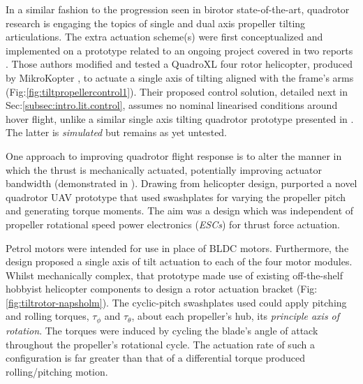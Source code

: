 \par
In a similar fashion to the progression seen in birotor state-of-the-art, quadrotor research is engaging the topics of single and dual axis propeller tilting articulations. The extra actuation scheme(s) were first conceptualized and implemented on a prototype related to an ongoing project covered in two reports \cite{tiltpropellercontrol,tiltpropellerflight}. Those authors modified and tested a QuadroXL four rotor helicopter, produced by MikroKopter \cite{mikrokopter}, to actuate a single axis of tilting aligned with the frame's arms (Fig:\ref{fig:tiltpropellercontrol1}). Their proposed control solution, detailed next in Sec:\ref{subsec:intro.lit.control}, assumes no nominal linearised conditions around hover flight, unlike a similar single axis tilting quadrotor prototype presented in \cite{singleaxistilting}. The latter is \emph{simulated} but remains as yet untested.
\par
One approach to improving quadrotor flight response is to alter the manner in which the thrust is mechanically actuated, potentially improving actuator bandwidth (demonstrated in \cite{tiltgasco,tiltrihani}). Drawing from helicopter design, \cite{napsholm} purported a novel quadrotor UAV prototype that used swashplates for varying the propeller pitch and generating torque moments. The aim was a design which was independent of propeller rotational speed power electronics (\emph{ESCs}) for thrust force actuation.
\par
Petrol motors were intended for use in place of BLDC motors. Furthermore, the design proposed a single axis of tilt actuation to each of the four motor modules. Whilst mechanically complex, that prototype made use of existing off-the-shelf hobbyist helicopter components to design a rotor actuation bracket (Fig:\ref{fig:tiltrotor-napsholm}). The cyclic-pitch swashplates \cite{autonomousrobotspitch} used could apply pitching and rolling torques, $\tau_{\phi}$ and $\tau_{\theta}$, about each propeller's hub, its \emph{principle axis of rotation}. The torques were induced by cycling the blade's angle of attack throughout the propeller's rotational cycle. The actuation rate of such a configuration is far greater than that of a differential torque produced rolling/pitching motion.
